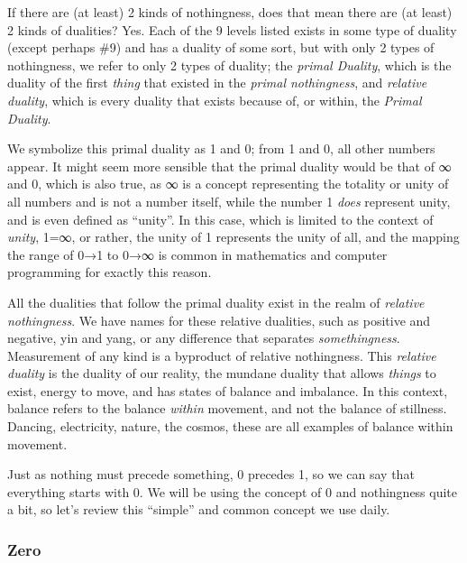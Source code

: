 \documentclass[
]{article}
\begin{document}
If there are (at least) 2 kinds of nothingness, does that mean there are
(at least) 2 kinds of dualities? Yes. Each of the 9 levels listed exists
in some type of duality (except perhaps \#9) and has a duality of some
sort, but with only 2 types of nothingness, we refer to only 2 types of
duality; the \emph{primal Duality}, which is the duality of the first
\emph{thing} that existed in the \emph{primal nothingness}, and
\emph{relative duality}, which is every duality that exists because of,
or within, the \emph{Primal Duality}.

We symbolize this primal duality as 1 and 0; from 1 and 0, all other
numbers appear. It might seem more sensible that the primal duality
would be that of ∞ and 0, which is also true, as ∞ is a concept
representing the totality or unity of all numbers and is not a number
itself, while the number 1 \emph{does} represent unity, and is even
defined as ``unity''. In this case, which is limited to the context of
\emph{unity}, 1=∞, or rather, the unity of 1 represents the unity of
all, and the mapping the range of 0→1 to 0→∞ is common in mathematics
and computer programming for exactly this reason.

All the dualities that follow the primal duality exist in the realm of
\emph{relative nothingness}. We have names for these relative dualities,
such as positive and negative, yin and yang, or any difference that
separates \emph{somethingness}. Measurement of any kind is a byproduct
of relative nothingness. This \emph{relative duality} is the duality of
our reality, the mundane duality that allows \emph{things} to exist,
energy to move, and has states of balance and imbalance. In this
context, balance refers to the balance \emph{within} movement, and not
the balance of stillness. Dancing, electricity, nature, the cosmos,
these are all examples of balance within movement.

Just as nothing must precede something, 0 precedes 1, so we can say that
everything starts with 0. We will be using the concept of 0 and
nothingness quite a bit, so let's review this ``simple'' and common
concept we use daily.

\subsubsection{Zero}\label{zero}
\end{document}

